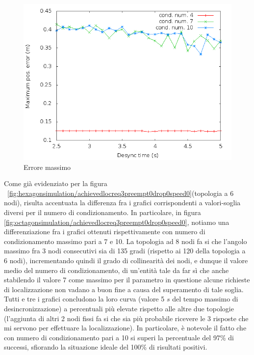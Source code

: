 \documentclass[Lau,binding=0.6cm]{sapthesis}
\begin{document}
\begin{figure}[H]
    \centering
    \includegraphics[scale=0.5]{octagonsimulation/maxposerrorreq3preempt0drop0speed0.png}
    \caption{Errore massimo}
    \label{fig:octagonsimulation/maxposerrorreq3preempt0drop0speed0}
\end{figure}
Come già evidenziato per la figura ~\ref{fig:hexagonsimulation/achievedlocreq3preempt0drop0speed0}(topologia a 6 nodi), risulta accentuata la differenza fra i grafici corrispondenti a valori-soglia diversi per il numero di condizionamento. In particolare, in figura \ref{fig:octagonsimulation/achievedlocreq3preempt0drop0speed0}, notiamo una differenziazione fra i grafici ottenuti rispettivamente con numero di condizionamento massimo pari a 7 e 10. La topologia ad 8 nodi fa si che l'angolo massimo fra 3 nodi consecutivi sia di 135 gradi (rispetto ai 120 della topologia a 6 nodi), incrementando quindi il grado di collinearità dei nodi, e dunque il valore medio del numero di condizionamento, di un'entità tale da far sì che anche stabilendo il valore 7 come massimo per il parametro in questione alcune richieste di localizzazione non vadano a buon fine a causa del superamento di tale soglia.
Tutti e tre i grafici concludono la loro curva (valore 5 $s$ del tempo massimo di desincronizzazione) a percentuali più elevate rispetto alle altre due topologie (l'aggiunta di altri 2 nodi fissi fa si che sia più probabile ricevere le 3 risposte che mi servono per effettuare la localizzazione). In particolare, è notevole il fatto che  con numero di condizionamento pari a 10 si superi la percentuale del 97\% di successi, sfiorando la situazione ideale del 100\% di risultati positivi.
\end{document}
